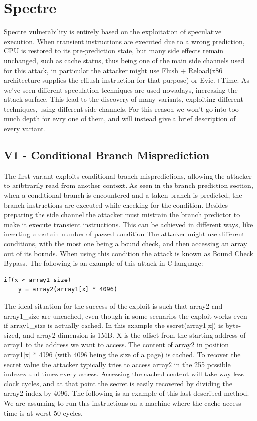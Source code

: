 \section{Spectre}
Spectre vulnerability is entirely based on the exploitation of speculative execution.
When transient instructions are executed due to a wrong prediction, CPU is restored to its pre-prediction state, but many side effects remain unchanged, such as cache status, thus being one of the main side channels used for this attack, in particular the attacker might use Flush + Reload(x86 architecture supplies the clflush instruction for that purpose) or Evict+Time.
As we've seen different speculation techniques are used nowadays, increasing the attack surface.
This lead to the discovery of many variants, exploiting different techniques, using different side channels.
For this reason we won't go into too much depth for evry one of them, and will instead give a brief description of every variant.

\subsection{V1 - Conditional Branch Misprediction}
The first variant exploits conditional branch mispredictions, allowing the attacker to aribtrarily read from another context. As seen in the branch prediction section, when a conditional branch is encountered and a taken branch is predicted, the branch instructions are executed while checking for the condition.
Besides preparing the side channel the attacker must mistrain the branch predictor to make it execute transient instructions.
This can be achieved in different ways, like inserting a certain number of passed condition 
The attacker might use different conditions, with the most one being a bound check, and then accessing an array out of its bounds. When using this condition the attack is known as Bound Check Bypass.
The following is an example of this attack in C language:

\begin{Verbatim}[fontsize=\small]
if(x < array1_size)
	y = array2(array1[x] * 4096)
\end{Verbatim}

The ideal situation for the success of the exploit is such that array2 and array1\_size are uncached, even though in some scenarios the exploit works even if array1\_size is actually cached.
In this example the secret(array1[x]) is byte-sized, and array2 dimension is 1MB.
X is the offset from the starting address of array1 to the address we want to access.
The content of array2 in position array1[x] * 4096 (with 4096 being the size of a page) is cached.
To recover the secret value the attacker typically tries to access array2 in the 255 possible indexes and times every access.
Accessing the cached content will take way less clock cycles, and at that point the secret is easily recovered by dividing the array2 index by 4096.
The following is an example of this last described  method. We are assuming to run this instructions on a machine where the cache access time is at worst 50 cycles.

